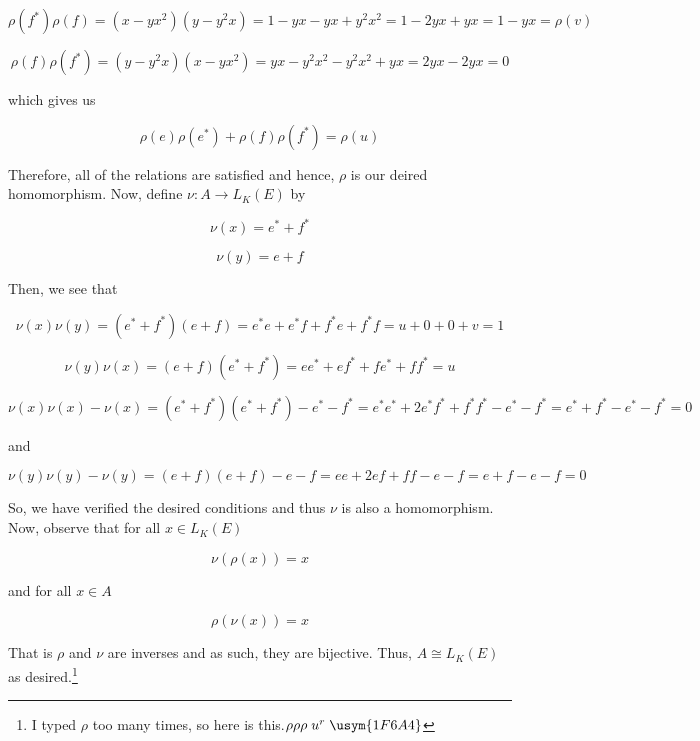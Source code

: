 \begin{solution}
    $$\rho(f^*)\rho(f)=(x-yx^2)(y-y^2x)=1-yx-yx+y^2x^2=1-2yx+yx=1-yx=\rho(v)$$

    $$\rho(f)\rho(f^*)=(y-y^2x)(x-yx^2)=yx-y^2x^2-y^2x^2+yx=2yx-2yx=0$$
    
    which gives us

    $$\rho(e)\rho(e^*)+\rho(f)\rho(f^*)=\rho(u)$$

    Therefore, all of the relations are satisfied and hence, $\rho$ is our deired homomorphism. Now,
    define $\nu:A\to L_K(E)$ by

    $$\nu(x)=e^*+f^*$$

    $$\nu(y)=e+f$$

    Then, we see that

    $$\nu(x)\nu(y)=(e^*+f^*)(e+f)=e^*e+e^*f+f^*e+f^*f=u+0+0+v=1$$

    $$\nu(y)\nu(x)=(e+f)(e^*+f^*)=ee^*+ef^*+fe^*+ff^*=u$$

    $$\nu(x)\nu(x)-\nu(x)=(e^*+f^*)(e^*+f^*)-e^*-f^*=e^*e^*+2e^*f^*+f^*f^*-e^*-f^*=e^*+f^*-e^*-f^*=0$$

    and

    $$\nu(y)\nu(y)-\nu(y)=(e+f)(e+f)-e-f=ee+2ef+ff-e-f=e+f-e-f=0$$

    So, we have verified the desired conditions and thus $\nu$ is also a homomorphism. Now, observe that
    for all $x\in L_K(E)$

    $$\nu(\rho(x))=x$$

    and for all $x\in A$

    $$\rho(\nu(x))=x$$

    That is $\rho$ and $\nu$ are inverses and as such, they are bijective. Thus, $A\cong L_K(E)$ as
    desired.\footnote{I typed $\rho$ too many times, so here is this.$\rho\rho\rho\;u^r\;\usym{1F6A4}$}

\end{solution}